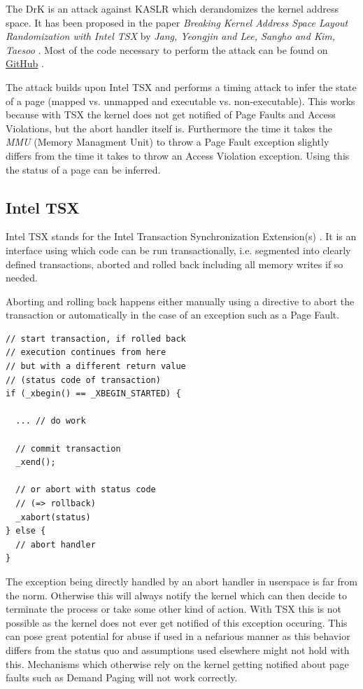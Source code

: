 The DrK is an attack against KASLR which derandomizes the kernel address space.
It has been proposed in the paper \textit{Breaking Kernel Address Space Layout Randomization with Intel TSX} by \textit{Jang, Yeongjin and Lee, Sangho and Kim, Taesoo} \cite{drk}.
Most of the code necessary to perform the attack can be found on \href{https://github.com/sslab-gatech/DrK}{GitHub} \cite{drk-attack-proof-of-concept-github}.

The attack builds upon Intel TSX and performs a timing attack to infer the state of a page (mapped vs. unmapped and executable vs. non-executable).
This works because with TSX the kernel does not get notified of Page Faults and Access Violations, but the abort handler itself is.
Furthermore the time it takes the \textit{MMU} (Memory Managment Unit) to throw a Page Fault exception slightly differs from the time it takes to throw an Access Violation exception.
Using this the status of a page can be inferred.

\subsection{Intel TSX}

Intel TSX stands for the Intel Transaction Synchronization Extension(s) \cite{intel-tsx-overview}.
It is an interface using which code can be run transactionally, i.e. segmented into clearly defined transactions, aborted and rolled back including all memory writes if so needed.

Aborting and rolling back happens either manually using a directive to abort the transaction or automatically in the case of an exception such as a Page Fault.

\begin{lstlisting}
// start transaction, if rolled back
// execution continues from here
// but with a different return value
// (status code of transaction)
if (_xbegin() == _XBEGIN_STARTED) {

  ... // do work

  // commit transaction
  _xend();

  // or abort with status code
  // (=> rollback)
  _xabort(status)
} else {
  // abort handler
}
\end{lstlisting}

The exception being directly handled by an abort handler in userspace is far from the norm. Otherwise this will always notify the kernel which can then decide to terminate the process or take some other kind of action.
With TSX this is not possible as the kernel does not ever get notified of this exception occuring.
This can pose great potential for abuse if used in a nefarious manner as this behavior differs from the status quo and assumptions used elsewhere might not hold with this.
Mechanisms which otherwise rely on the kernel getting notified about page faults such as Demand Paging will not work correctly.

